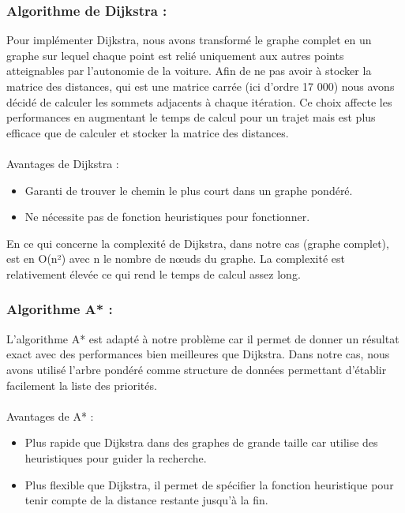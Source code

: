\documentclass[12pt,titlepage]{report}
\begin{document}
\subsubsection{Algorithme de Dijkstra :}

Pour implémenter Dijkstra, nous avons transformé le graphe complet en un graphe sur lequel chaque point est relié uniquement aux autres points atteignables par l’autonomie de la voiture. Afin de ne pas avoir à stocker la matrice des distances, qui est une matrice carrée (ici d’ordre 17 000) nous avons décidé de calculer les sommets adjacents à chaque itération. Ce choix affecte les performances en augmentant le temps de calcul pour un trajet mais est plus efficace que de calculer et stocker la matrice des distances.\\
\\
Avantages de Dijkstra :
\begin{itemize}
\item Garanti de trouver le chemin le plus court dans un graphe pondéré.
\item Ne nécessite pas de fonction heuristiques pour fonctionner.\\
\end{itemize}

En ce qui concerne la complexité de Dijkstra, dans notre cas (graphe complet), est en O(n²) avec n le nombre de nœuds du graphe. La complexité est relativement élevée ce qui rend le temps de calcul assez long.

\subsubsection{Algorithme A* :}

L’algorithme A* est adapté à notre problème car il permet de donner un résultat exact avec des performances bien meilleures que Dijkstra. Dans notre cas, nous avons utilisé l’arbre pondéré comme structure de données permettant d’établir facilement la liste des priorités.\\
\\
Avantages de A* :
\begin{itemize}
\item Plus rapide que Dijkstra dans des graphes de grande taille car utilise des heuristiques pour guider la recherche.
\item Plus flexible que Dijkstra, il permet de spécifier la fonction heuristique pour tenir compte de la distance restante jusqu’à la fin.\\
\end{itemize}
\end{document}

